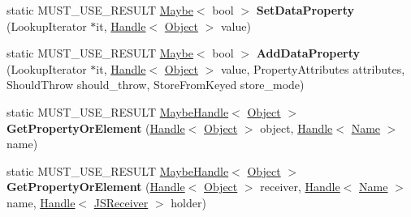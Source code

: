 \begin{DoxyCompactItemize}
\item 
static M\+U\+S\+T\+\_\+\+U\+S\+E\+\_\+\+R\+E\+S\+U\+LT \hyperlink{classv8_1_1_maybe}{Maybe}$<$ bool $>$ {\bfseries Set\+Data\+Property} (Lookup\+Iterator $\ast$it, \hyperlink{classv8_1_1internal_1_1_handle}{Handle}$<$ \hyperlink{classv8_1_1internal_1_1_object}{Object} $>$ value)\hypertarget{classv8_1_1internal_1_1_object_a50e487fae51128bac1331b9f6acbc753}{}\label{classv8_1_1internal_1_1_object_a50e487fae51128bac1331b9f6acbc753}

\item 
static M\+U\+S\+T\+\_\+\+U\+S\+E\+\_\+\+R\+E\+S\+U\+LT \hyperlink{classv8_1_1_maybe}{Maybe}$<$ bool $>$ {\bfseries Add\+Data\+Property} (Lookup\+Iterator $\ast$it, \hyperlink{classv8_1_1internal_1_1_handle}{Handle}$<$ \hyperlink{classv8_1_1internal_1_1_object}{Object} $>$ value, Property\+Attributes attributes, Should\+Throw should\+\_\+throw, Store\+From\+Keyed store\+\_\+mode)\hypertarget{classv8_1_1internal_1_1_object_ac0c13bbe9389fc6fa557da39f2e0bda8}{}\label{classv8_1_1internal_1_1_object_ac0c13bbe9389fc6fa557da39f2e0bda8}

\item 
static M\+U\+S\+T\+\_\+\+U\+S\+E\+\_\+\+R\+E\+S\+U\+LT \hyperlink{classv8_1_1internal_1_1_maybe_handle}{Maybe\+Handle}$<$ \hyperlink{classv8_1_1internal_1_1_object}{Object} $>$ {\bfseries Get\+Property\+Or\+Element} (\hyperlink{classv8_1_1internal_1_1_handle}{Handle}$<$ \hyperlink{classv8_1_1internal_1_1_object}{Object} $>$ object, \hyperlink{classv8_1_1internal_1_1_handle}{Handle}$<$ \hyperlink{classv8_1_1internal_1_1_name}{Name} $>$ name)\hypertarget{classv8_1_1internal_1_1_object_a670ec732311c105dcf93c35fe2372daa}{}\label{classv8_1_1internal_1_1_object_a670ec732311c105dcf93c35fe2372daa}

\item 
static M\+U\+S\+T\+\_\+\+U\+S\+E\+\_\+\+R\+E\+S\+U\+LT \hyperlink{classv8_1_1internal_1_1_maybe_handle}{Maybe\+Handle}$<$ \hyperlink{classv8_1_1internal_1_1_object}{Object} $>$ {\bfseries Get\+Property\+Or\+Element} (\hyperlink{classv8_1_1internal_1_1_handle}{Handle}$<$ \hyperlink{classv8_1_1internal_1_1_object}{Object} $>$ receiver, \hyperlink{classv8_1_1internal_1_1_handle}{Handle}$<$ \hyperlink{classv8_1_1internal_1_1_name}{Name} $>$ name, \hyperlink{classv8_1_1internal_1_1_handle}{Handle}$<$ \hyperlink{classv8_1_1internal_1_1_j_s_receiver}{J\+S\+Receiver} $>$ holder)\hypertarget{classv8_1_1internal_1_1_object_a0380d3e43b2448b4d536964b1d7dede7}{}\label{classv8_1_1internal_1_1_object_a0380d3e43b2448b4d536964b1d7dede7}


\end{DoxyCompactItemize}
